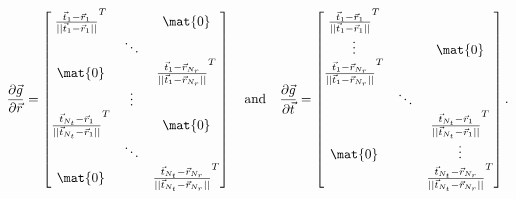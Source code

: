 \begin{align}
\nonumber
\frac{\partial\vec{g}}{\partial\vec{r}} = 
\begin{bmatrix}
\frac{\vec{t}_1 - \vec{r}_1}{||\vec{t}_1 - \vec{r}_1||}^T & {} & \mat{0} \\
{}&\ddots&{}\\
\mat{0}&{}&\frac{\vec{t}_1 - \vec{r}_{N_r}}{||\vec{t}_1 - \vec{r}_{N_r}||}^T \\
{}&\vdots&{}\\
\frac{\vec{t}_{N_t} - \vec{r}_1}{||\vec{t}_{N_t} - \vec{r}_1||}^T & {} & \mat{0} \\
{}&\ddots&{}\\
\mat{0}&{}&\frac{\vec{t}_{N_t} - \vec{r}_{N_r}}{||\vec{t}_{N_t} - \vec{r}_{N_r}||}^T 
\end{bmatrix}\quad\text{and}\quad
\frac{\partial\vec{g}}{\partial\vec{t}} = 
\begin{bmatrix}
\frac{\vec{t}_1 - \vec{r}_1}{||\vec{t}_1 - \vec{r}_1||}^T & {} & {} \\
\vdots&{}&\mat{0}\\
\frac{\vec{t}_1 - \vec{r}_{N_r}}{||\vec{t}_1 - \vec{r}_{N_r}||}^T&{}&{} \\
{}&\ddots&{}\\
{} & {} & \frac{\vec{t}_{N_t} - \vec{r}_1}{||\vec{t}_{N_t} - \vec{r}_1||}^T \\
\mat{0}&{}&\vdots\\
{}&{}&\frac{\vec{t}_{N_t} - \vec{r}_{N_r}}{||\vec{t}_{N_t} - \vec{r}_{N_r}||}^T 
\end{bmatrix}.
\end{align}